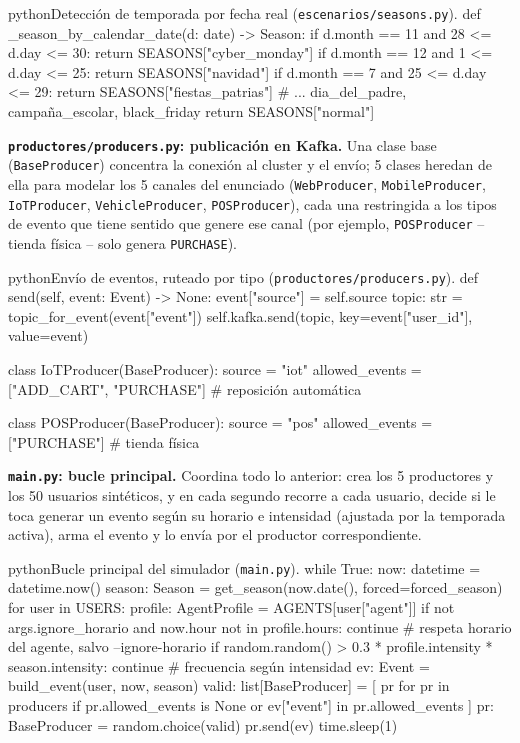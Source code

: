 \begin{sourcecode}[\label{code:seasons}]{python}{Detección de temporada por fecha real (\texttt{escenarios/seasons.py}).}
def _season_by_calendar_date(d: date) -> Season:
    if d.month == 11 and 28 <= d.day <= 30:
        return SEASONS["cyber_monday"]
    if d.month == 12 and 1 <= d.day <= 25:
        return SEASONS["navidad"]
    if d.month == 7 and 25 <= d.day <= 29:
        return SEASONS["fiestas_patrias"]
    # ... dia_del_padre, campaña_escolar, black_friday
    return SEASONS["normal"]
\end{sourcecode}

\textbf{\texttt{productores/producers.py}: publicación en Kafka.} Una clase base (\texttt{BaseProducer}) concentra la conexión al cluster y el envío; 5 clases heredan de ella para modelar los 5 canales del enunciado (\texttt{WebProducer}, \texttt{MobileProducer}, \texttt{IoTProducer}, \texttt{VehicleProducer}, \texttt{POSProducer}), cada una restringida a los tipos de evento que tiene sentido que genere ese canal (por ejemplo, \texttt{POSProducer} -- tienda física -- solo genera \texttt{PURCHASE}).

\begin{sourcecode}[\label{code:producers}]{python}{Envío de eventos, ruteado por tipo (\texttt{productores/producers.py}).}
def send(self, event: Event) -> None:
    event["source"] = self.source
    topic: str = topic_for_event(event["event"])
    self.kafka.send(topic, key=event["user_id"], value=event)

class IoTProducer(BaseProducer):
    source = "iot"
    allowed_events = ["ADD_CART", "PURCHASE"]  # reposición automática

class POSProducer(BaseProducer):
    source = "pos"
    allowed_events = ["PURCHASE"]  # tienda física
\end{sourcecode}

\textbf{\texttt{main.py}: bucle principal.} Coordina todo lo anterior: crea los 5 productores y los 50 usuarios sintéticos, y en cada segundo recorre a cada usuario, decide si le toca generar un evento según su horario e intensidad (ajustada por la temporada activa), arma el evento y lo envía por el productor correspondiente.

\begin{sourcecode}[\label{code:mainloop}]{python}{Bucle principal del simulador (\texttt{main.py}).}
while True:
    now: datetime = datetime.now()
    season: Season = get_season(now.date(), forced=forced_season)
    for user in USERS:
        profile: AgentProfile = AGENTS[user["agent"]]
        if not args.ignore_horario and now.hour not in profile.hours:
            continue  # respeta horario del agente, salvo --ignore-horario
        if random.random() > 0.3 * profile.intensity * season.intensity:
            continue  # frecuencia según intensidad
        ev: Event = build_event(user, now, season)
        valid: list[BaseProducer] = [
            pr for pr in producers
            if pr.allowed_events is None or ev["event"] in pr.allowed_events
        ]
        pr: BaseProducer = random.choice(valid)
        pr.send(ev)
    time.sleep(1)
\end{sourcecode}

